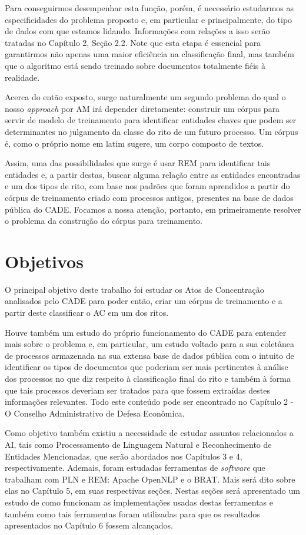 \documentclass[11pt]{report}
\begin{document}
Para conseguirmos desempenhar esta função, porém, é necessário estudarmos as especificidades do problema proposto e, em particular e principalmente,
do tipo de dados com que estamos lidando. Informações com relações a isso serão tratadas no Capítulo 2, Seção 2.2.
Note que esta etapa é essencial para garantirmos não apenas uma maior eficiência na classificação final, mas também que o algoritmo está sendo treinado sobre
documentos totalmente fiéis à realidade.

Acerca do então exposto, surge naturalmente um segundo problema do qual o nosso \textit{approach} por AM irá depender diretamente: construir um córpus para servir de modelo de
treinamento para identificar entidades chaves que podem ser determinantes no julgamento da classe do rito de um futuro processo. Um córpus é, como o próprio nome em latim sugere, um corpo composto de textos.

Assim, uma das possibilidades que surge é usar REM para identificar tais entidades e, a partir destas, buscar alguma relação entre as entidades encontradas e um dos tipos de rito, com
base nos padrões que foram aprendidos a partir do córpus de treinamento criado com processos antigos, presentes na base de dados pública do CADE. Focamos
a nossa atenção, portanto, em primeiramente resolver o problema da construção do córpus para treinamento.

\section{Objetivos}

\indent\indent O principal objetivo deste trabalho foi estudar os Atos de Concentração analisados pelo CADE para poder então, criar um córpus de treinamento e a partir deste classificar
o AC em um dos ritos.

Houve também um estudo do próprio funcionamento do CADE para entender mais sobre o problema e, em particular, um estudo voltado para a sua coletânea de processos
armazenada na sua extensa base de dados pública com o intuito de identificar os tipos de documentos que poderiam ser mais pertinentes à análise dos processos no que diz respeito
à classificação final do rito e também à forma que tais processos deveriam ser tratados para que fossem extraídas destes informações relevantes. Todo este conteúdo pode ser encontrado no
Capítulo 2 - O Conselho Administrativo de Defesa Econômica.

Como objetivo também existiu a necessidade de estudar assuntos relacionados a AI, tais como Processamento de Linguagem Natural e Reconhecimento de Entidades Mencionadas, que serão abordados nos Capítulos 3 e 4, respectivamente.
Ademais, foram estudadas ferramentas de \textit{software} que trabalham com PLN e REM: Apache OpenNLP e o BRAT. Mais será dito sobre elas no Capítulo 5, em suas
respectivas seções. Nestas seções será apresentado um estudo de como funcionam as implementações usadas destas ferramentas e também como tais ferramentas foram
utilizadas para que os resultados apresentados no Capítulo 6 fossem alcançados.
\end{document}
